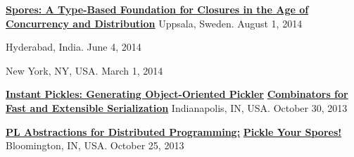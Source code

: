 \documentclass[9pt]{article}
\begin{document}
\noindent\href{https://speakerdeck.com/heathermiller/spores-a-type-based-foundation-for-closures-in-the-age-of-concurrency-and-distribution}{\bf Spores: A Type-Based Foundation for Closures in the Age of} \vspace{-0.03in}
\linebreak\noindent\href{https://speakerdeck.com/heathermiller/spores-a-type-based-foundation-for-closures-in-the-age-of-concurrency-and-distribution}{\bf Concurrency and Distribution}\dates{}
\linebreak\noindent Uppsala, Sweden. August 1, 2014
\bigskip

 \vspace{-0.03in}
\linebreak{}\dates{}
\linebreak\noindent Hyderabad, India. June 4, 2014
\bigskip

 \vspace{-0.03in}
\linebreak{}\dates{}
\linebreak\noindent New York, NY, USA. March 1, 2014
\bigskip

\noindent\href{https://speakerdeck.com/heathermiller/instant-pickles-generating-object-oriented-pickler-combinators-for-fast-and-extensible-serialization}{\bf Instant Pickles: Generating Object-Oriented Pickler} \vspace{-0.03in}
\linebreak\noindent\href{https://speakerdeck.com/heathermiller/instant-pickles-generating-object-oriented-pickler-combinators-for-fast-and-extensible-serialization}{\bf Combinators for Fast and Extensible Serialization}\dates{}
\linebreak\noindent Indianapolis, IN, USA. October 30, 2013
\bigskip

\noindent\href{http://heather.miller.am/files/IU-PL-Abstractions-for-Dist-Programming.pdf}{\bf PL Abstractions for Distributed Programming:} \vspace{-0.03in}
\linebreak\noindent\href{http://heather.miller.am/files/IU-PL-Abstractions-for-Dist-Programming.pdf}{\bf Pickle Your Spores!}\dates{}
\linebreak\noindent Bloomington, IN, USA. October 25, 2013
\bigskip
\end{document}
